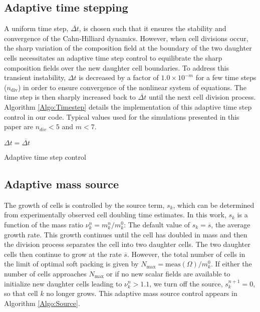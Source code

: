 \documentclass{article}
\begin{document}
\subsection{Adaptive time stepping}
A uniform time step, $\overline{\Delta t}$, is chosen such that it ensures the stability and convergence of the Cahn-Hilliard dynamics. However, when cell divisions occur, the sharp variation of the composition field at the boundary of the two daughter cells necessitates an adaptive time step control to equilibrate the sharp composition fields over the new daughter cell boundaries. To address this transient instability, $\Delta t$ is decreased by a factor of $1.0\times 10^{-m}$ for a few time steps ($n_\text{div}$) in order to ensure convergence of the nonlinear system of equations. The time step is then sharply increased back to $\overline{\Delta t}$ until the next cell division process. Algorithm \ref{Algo:Timestep} details the implementation of this adaptive time step control in our code. Typical values used for the simulations presented in this paper are $n_{div}<5$ and $m<7$.

\begin{algorithm}[h]
$\Delta t=\overline{\Delta t}$\;
\caption{Adaptive time step control\label{Algo:Timestep}}
\end{algorithm}

\subsection{Adaptive mass source}
\label{sec:source}
The growth of cells is controlled by the source term, $s_k$, which can be determined from experimentally observed cell doubling time estimates. In this work, $s_k$ is a function of the mass ratio $\nu_k^n = m_k^n/m_k^0$: The default value of $s_k=\overline{s}$, the average growth rate. This growth continues until the cell has doubled in mass and then the division process separates the cell into two daughter cells. The two daughter cells then continue to grow at the rate $\overline{s}$. However, the total number of cells in the limit of optimal soft packing is given by $N_\text{max}=\text{meas}(\Omega)/m_k^0$. If either the number of cells approaches $N_\text{max}$ or if no new scalar fields are available to initialize new daughter cells leading to $\nu_k^n > 1.1$, we turn off the source, $s_k^{n+1} = 0$, so that cell $k$ no longer grows. This adaptive mass source control appears in Algorithm \ref{Algo:Source}.
\end{document}
